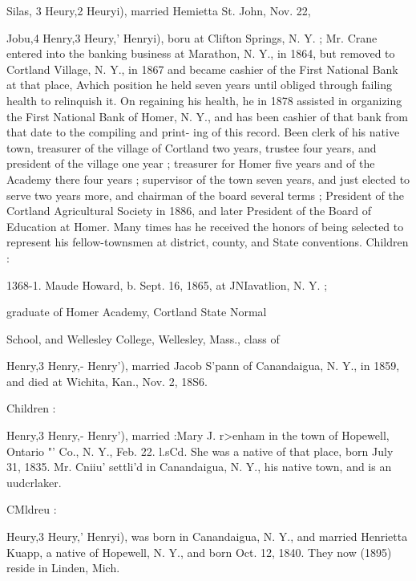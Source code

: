 \documentclass[oneside]{book}
\begin{document}
Silas, 3 Heury,2 Heuryi), married Hemietta St. John, Nov. 22, 


Jobu,4 Henry,3 Heury,' Henryi), boru at Clifton Springs, N. Y. ; 
Mr. Crane entered into the banking business at Marathon, N. Y., 
in 1864, but removed to Cortland Village, N. Y., in 1867 and 
became cashier of the First National Bank at that place, Avhich 
position he held seven years until obliged through failing health 
to relinquish it. On regaining his health, he in 1878 assisted in 
organizing the First National Bank of Homer, N. Y., and has 
been cashier of that bank from that date to the compiling and print- 
ing of this record. Been clerk of his native town, treasurer of 
the village of Cortland two years, trustee four years, and president 
of the village one year ; treasurer for Homer five years and of the 
Academy there four years ; supervisor of the town seven years, 
and just elected to serve two years more, and chairman of the 
board several terms ; President of the Cortland Agricultural 
Society in 1886, and later President of the Board of Education 
at Homer. Many times has he received the honors of being 
selected to represent his fellow-townsmen at district, county, and 
State conventions. Children : 

1368-1. Maude Howard, b. Sept. 16, 1865, at JNIavatlion, N. Y. ; 

graduate of Homer Academy, Cortland State Normal 

School, and Wellesley College, Wellesley, Mass., class of 



Henry,3 Henry,- Henry'), married Jacob S'pann of Canandaigua, 
N. Y., in 1859, and died at Wichita, Kan., Nov. 2, 18S6. 

Children : 




Henry,3 Henry,- Henry'), married :Mary J. r>enham in the town 
of Hopewell, Ontario "' Co., N. Y., Feb. 22. l.sCd. She was a 
native of that place, born July 31, 1835. Mr. Cniiu' settli'd in 
Canandaigua, N. Y., his native town, and is an uudcrlaker. 





CMldreu : 





Heury,3 Heury,' Henryi), was born in Canandaigua, N. Y., and 
married Henrietta Kuapp, a native of Hopewell, N. Y., and born 
Oct. 12, 1840. They now (1895) reside in Linden, Mich. 
\end{document}

